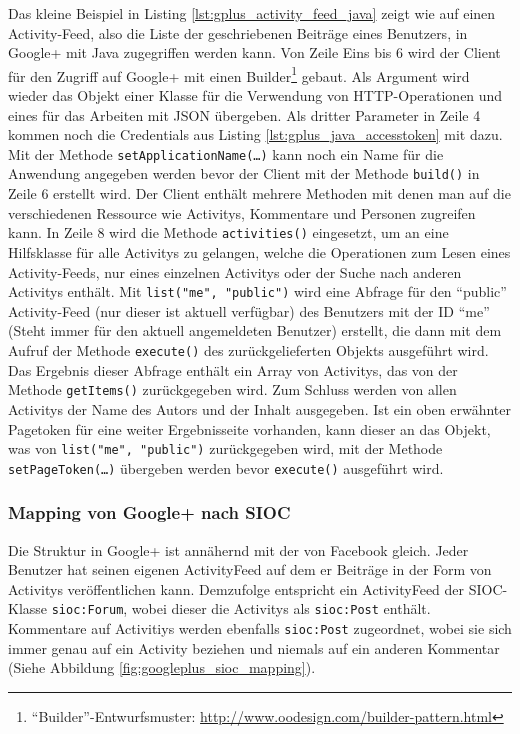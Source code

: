 Das kleine Beispiel in Listing \ref{lst:gplus_activity_feed_java} zeigt wie auf einen Activity-Feed, also die Liste der geschriebenen Beiträge eines Benutzers, in Google+ mit Java zugegriffen werden kann. Von Zeile Eins bis 6 wird der Client für den Zugriff auf Google+ mit einen Builder\footnote{\enquote{Builder}-Entwurfsmuster: \url{http://www.oodesign.com/builder-pattern.html}} gebaut. Als Argument wird wieder das Objekt einer Klasse für die Verwendung von HTTP-Operationen und eines für das Arbeiten mit JSON übergeben. Als dritter Parameter in Zeile 4 kommen noch die Credentials aus Listing \ref{lst:gplus_java_accesstoken} mit dazu. Mit der Methode \texttt{setApplicationName(\dots)} kann noch ein Name für die Anwendung angegeben werden bevor der Client mit der Methode \texttt{build()} in Zeile 6 erstellt wird. Der Client enthält mehrere Methoden mit denen man auf die verschiedenen Ressource wie Activitys, Kommentare und Personen zugreifen kann. In Zeile 8 wird die Methode \texttt{activities()} eingesetzt, um an eine Hilfsklasse für alle Activitys zu gelangen, welche die Operationen zum Lesen eines Activity-Feeds, nur eines einzelnen Activitys oder der Suche nach anderen Activitys enthält. Mit \texttt{list("me", "public")} wird eine Abfrage für den \enquote{public} Activity-Feed (nur dieser ist aktuell verfügbar) des Benutzers mit der ID \enquote{me} (Steht immer für den aktuell angemeldeten Benutzer) erstellt, die dann mit dem Aufruf der Methode \texttt{execute()} des zurückgelieferten Objekts ausgeführt wird. Das Ergebnis dieser Abfrage enthält ein Array von Activitys, das von der Methode \texttt{getItems()} zurückgegeben wird. Zum Schluss werden von allen Activitys der Name des Autors und der Inhalt ausgegeben. Ist ein oben erwähnter Pagetoken für eine weiter Ergebnisseite vorhanden, kann dieser an das Objekt, was von \texttt{list("me", "public")} zurückgegeben wird, mit der Methode \texttt{setPageToken(\dots)} übergeben werden bevor \texttt{execute()} ausgeführt wird.


\subsubsection{Mapping von Google+ nach SIOC} %
\label{ssub:google_mapping_nach_sioc}

Die Struktur in Google+ ist annähernd mit der von Facebook gleich. Jeder Benutzer hat seinen eigenen ActivityFeed auf dem er Beiträge in der Form von Activitys veröffentlichen kann. Demzufolge entspricht ein ActivityFeed der SIOC-Klasse \texttt{sioc:Forum}, wobei dieser die Activitys als \texttt{sioc:Post} enthält. Kommentare auf Activitiys werden ebenfalls \texttt{sioc:Post} zugeordnet, wobei sie sich immer genau auf ein Activity beziehen und niemals auf ein anderen Kommentar (Siehe Abbildung \ref{fig:googleplus_sioc_mapping}). 

